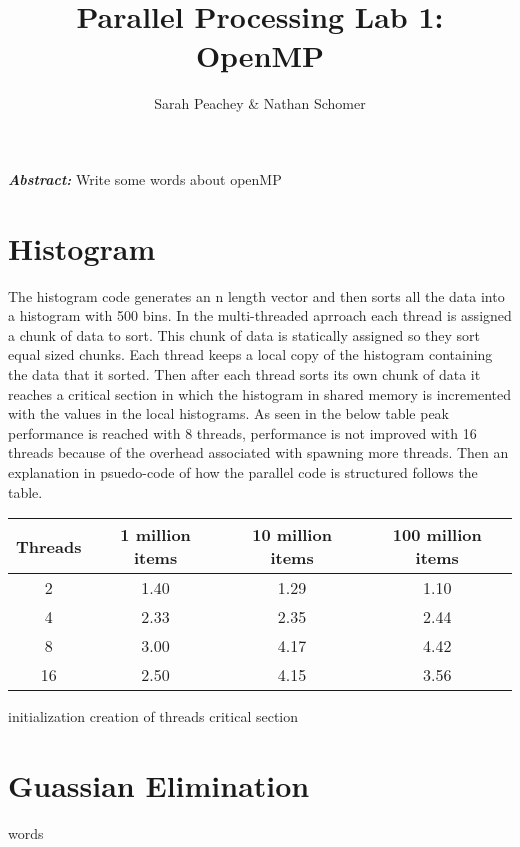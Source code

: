 \documentclass[12pt]{article}
\begin{document}
\title{Parallel Processing Lab 1: OpenMP}
\author{Sarah Peachey \& Nathan Schomer}
\maketitle

\textbf{\textit{Abstract:}} Write some words about openMP

\newpage

\tableofcontents

\newpage


\section{Histogram\label{histo}}
\qquad The histogram code generates an n length vector and then sorts all
the data into a histogram with 500 bins. In the multi-threaded aprroach each
thread is assigned a chunk of data to sort. This chunk of data is statically
assigned so they sort equal sized chunks. Each thread keeps a local copy of
the histogram containing the data that it sorted. Then after each thread
sorts its own chunk of data it reaches a critical section in which the
histogram in shared memory is incremented with the values in the local
histograms. As seen in the below table peak performance is reached with 8
threads, performance is not improved with 16 threads because of the overhead
associated with spawning more threads. Then an explanation in psuedo-code of
how the parallel code is structured follows the table.  

\begin{center}
\hspace*{-2.5cm}
\begin{tabular}{@{}|c|c|c|c|}
\hline
Threads & 1 million items & 10 million items & 100 million items \\
\hline 
2 & 1.40 & 1.29 & 1.10 \\
\hline
4 & 2.33 & 2.35 & 2.44 \\
\hline
8 & 3.00 & 4.17 & 4.42 \\
\hline 
16 & 2.50 & 4.15 & 3.56 \\
\hline 
\end{tabular}
\hspace*{-2.5cm}
\end{center}

\begin{algorithm}[H]
\SetAlgoLined
{}
initialization\;
creation of threads\; 
critical section\; 
\end{algorithm}



\section{Guassian Elimination\label{guass}}
\qquad words 
\end{document}
